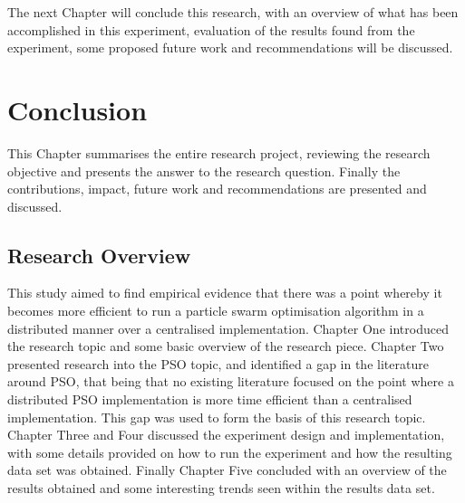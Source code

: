 \documentclass[oneside,12pt]{book}
\begin{document}
The next Chapter will conclude this research, with an overview of what has been accomplished in this experiment, evaluation of the results found from the experiment, some proposed future work and recommendations will be discussed. 


\chapter{Conclusion}
This Chapter summarises the entire research project, reviewing the research objective and presents the answer to the research question. Finally the contributions, impact, future work and recommendations are presented and discussed. 

\section{Research Overview}
This study aimed to find empirical evidence that there was a point whereby it becomes more efficient to run a particle swarm optimisation algorithm in a distributed manner over a centralised implementation. Chapter One introduced the research topic and some basic overview of the research piece. Chapter Two presented research into the PSO topic, and identified a gap in the literature around PSO, that being that no existing literature focused on the point where a distributed PSO implementation is more time efficient than a centralised implementation. This gap was used to form the basis of this research topic. Chapter Three and Four discussed the experiment design and implementation, with some details provided on how to run the experiment and how the resulting data set was obtained. Finally Chapter Five concluded with an overview of the results obtained and some interesting trends seen within the results data set. 
\end{document}

